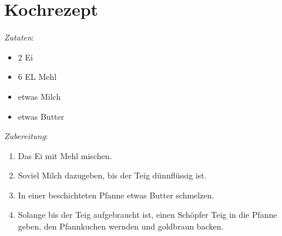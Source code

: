 \documentclass{article}
\begin{document}
\pagestyle{empty}
\section*{Kochrezept}
\textit{Zutaten}:
\begin{itemize}
	\item 2 Ei
	\item 6 EL Mehl
	\item etwas Milch
	\item etwas Butter
\end{itemize}
\textit{Zubereitung}:
\begin{enumerate}
	\item Das Ei mit Mehl mischen.
	\item Soviel Milch dazugeben, bis der Teig dünnflüssig ist.
	\item In einer beschichteten Pfanne etwas Butter schmelzen.
	\item Solange bis der Teig aufgebraucht ist, einen Schöpfer Teig in die Pfanne geben, den Pfannkuchen wernden und goldbraun backen.
\end{enumerate}
\end{document}
